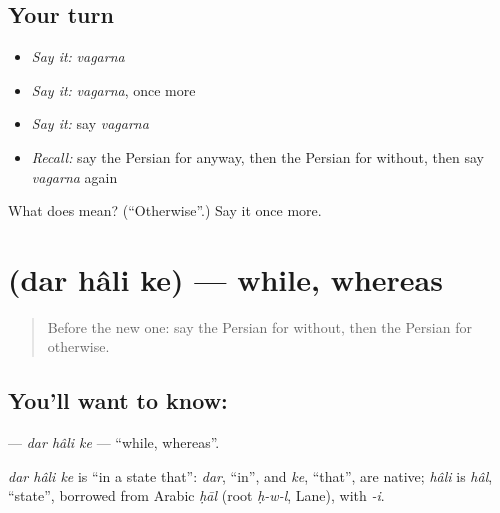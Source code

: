 \subsection*{Your turn}
\begin{itemize}
\raggedright
  \item \emph{Say it:} \emph{vagarna}
  \item \emph{Say it:} \emph{vagarna}, once more
  \item \emph{Say it:} say \emph{vagarna}
  \item \emph{Recall:} say the Persian for anyway, then the Persian for without, then say \emph{vagarna} again
\end{itemize}

\begin{tcolorbox}[breakable,colback=teal!4,colframe=teal!35!black,title={Before you move on}]
What does  mean? (\textquotedblleft{}Otherwise\textquotedblright{}.) Say it once more.
\end{tcolorbox}
\section[\texorpdfstring{\fa{در} \fa{حالی} \fa{که} (dar hâli ke)}{در حالی که (dar hâli ke)}]{   (dar hâli ke) — while, whereas}

\label{lesson:FA-C159-dar-hali-ke}



\begin{quote}
Before the new one: say the Persian for without, then the Persian for otherwise.
\end{quote}

\subsection*{You'll want to know:   }
\textbf{  } — \emph{dar hâli ke} — \textquotedblleft{}while, whereas\textquotedblright{}.

\begin{cousinweb}
\emph{dar hâli ke} is \textquotedblleft{}in a state that\textquotedblright{}: \emph{dar}, \textquotedblleft{}in\textquotedblright{}, and \emph{ke}, \textquotedblleft{}that\textquotedblright{}, are native; \emph{hâli} is \emph{hâl}, \textquotedblleft{}state\textquotedblright{}, borrowed from Arabic \emph{ḥāl} (root \emph{ḥ-w-l}, Lane), with \emph{-i}.
\end{cousinweb}

